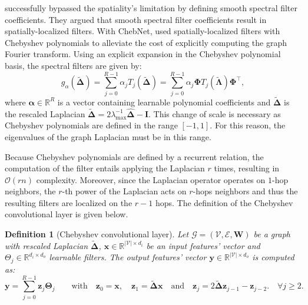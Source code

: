 \documentclass{article}
\newtheorem{definition}{Definition}[section]
\begin{document}
\citet{henaff2015deep} successfully bypassed the spatiality's limitation by defining smooth spectral filter coefficients. They argued that smooth spectral filter coefficients result in spatially-localized filters. With ChebNet, \citet{defferrard2016chebnet} used spatially-localized filters with Chebyshev polynomials to alleviate the cost of explicitly computing the graph Fourier transform. Using an explicit expansion in the Chebyshev polynomial basis, the spectral filters are given by:
\begin{equation} \label{eq:Chebyshev_filters}
g_{\alpha}(\boldsymbol{\tilde{\Delta}}) = \sum_{j=0}^{R-1} \alpha_j T_j (\boldsymbol{\tilde{\Delta}}) = \sum_{j=0}^{R-1} \alpha_j \boldsymbol{\Phi} T_j (\boldsymbol{\tilde{\Lambda}}) \boldsymbol{\Phi}^\top,
\end{equation}
where $\boldsymbol{\alpha} \in \mathbb{R}^R$ is a vector containing learnable polynomial coefficients and $\boldsymbol{\tilde{\Delta}}$ is the rescaled Laplacian $\boldsymbol{\tilde{\Delta}} = 2\lambda_{\max}^{-1}\boldsymbol{\hat{\Delta}} - \boldsymbol{I}$. This change of scale is necessary as Chebyshev polynomials are defined in the range $[-1,1]$. For this reason, the eigenvalues of the graph Laplacian must be in this range.

Because Chebyshev polynomials are defined by a recurrent relation, the computation of the filter entails applying the Laplacian $r$ times, resulting in $\mathcal{O}(rn)$ complexity. Moreover, since the Laplacian operator operates on $1$-hop neighbors, the $r$-th power of the Laplacian acts on $r$-hops neighbors and thus the resulting filters are localized on the $r-1$ hops. The definition of the Chebyshev convolutional layer is given below.

\begin{definition}[Chebyshev convolutional layer] \label{def:cheb_conv}
Let $\mathcal{G} = (\mathcal{V}, \mathcal{E}, \boldsymbol{W})$ be a graph with rescaled Laplacian $\boldsymbol{\tilde{\Delta}}$, $\boldsymbol{x} \in \mathbb{R}^{|\mathcal{V}| \times d_i}$  be an input features' vector and $\Theta_j \in \mathbb{R}^{d_i \times d_o}$ learnable filters. The output features' vector $\boldsymbol{y} \in \mathbb{R}^{|\mathcal{V}| \times d_o}$ is computed as:
\begin{equation}
\boldsymbol{y} = \sum_{j=0}^{R-1} \boldsymbol{z}_j \boldsymbol{\Theta}_j \qquad \text{with} \quad \boldsymbol{z}_0 = \boldsymbol{x}, \quad \boldsymbol{z}_1 = \boldsymbol{\tilde{\Delta} x} \quad  \text{and} \quad \boldsymbol{z}_j = 2 \boldsymbol{\tilde{\Delta} z}_{j-1} - \boldsymbol{z}_{j-2}. \quad \forall j \geq 2.
\end{equation}
\end{definition}
\end{document}
